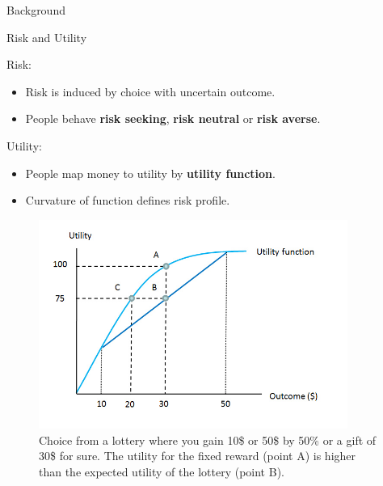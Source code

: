 \begin{exampleblock}{Background}
\begin{block}{\normalsize{Risk and Utility}}

Risk: 
\begin{itemize}
    \item Risk is induced by choice with uncertain outcome.
    \item People behave \textbf{risk seeking}, \textbf{risk neutral} or \textbf{risk averse}.
\end{itemize}

 Utility:
\begin{itemize}
    \item People map money to utility by \textbf{utility function}.
    \item Curvature of function defines risk profile.
\end{itemize}


\begin{figure}
  \centering
    \includegraphics[width=0.9\textwidth]{img/background/riskaversion.jpg}
  \caption{Choice from a lottery where you gain 10\$ or 50\$ by 50\% or a gift of 30\$ for sure. The utility for the fixed reward (point A) is higher than the expected utility of the lottery (point B).}
  
\end{figure}


\end{block}
\end{exampleblock}
